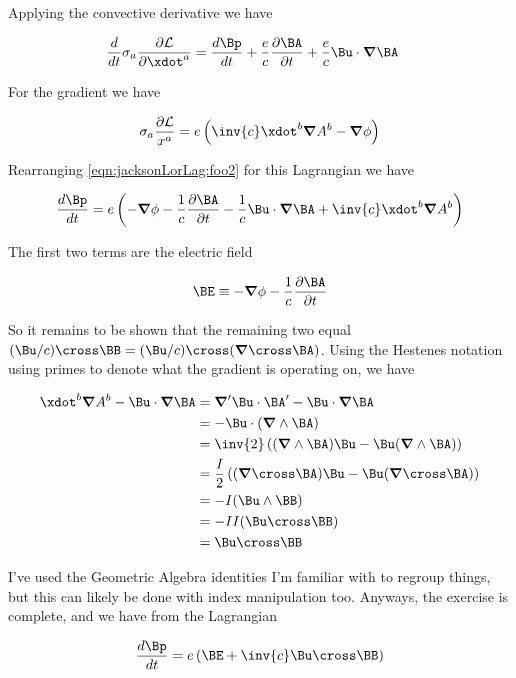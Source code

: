 Applying the convective derivative we have

\begin{align*}
\frac{d}{dt} 
\sigma_a \frac{\partial \LL}{\partial \xdot^a}
&=
\frac{d\Bp}{dt} 
+ \frac{e}{c} \frac{\partial \BA}{\partial t}
+ \frac{e}{c} \Bu \cdot \spacegrad \BA
\end{align*}

For the gradient we have

\begin{align*}
\sigma_a \frac{\partial \LL}{x^a} = e\left( \inv{c}\xdot^b \spacegrad A^b - \spacegrad \phi \right)
\end{align*}

Rearranging \ref{eqn:jacksonLorLag:foo2} for this Lagrangian we have

\begin{align*}
\frac{d\Bp}{dt} 
=
e \left( 
- \spacegrad \phi
- \frac{1}{c} \frac{\partial \BA}{\partial t}
- \frac{1}{c} \Bu \cdot \spacegrad \BA
 +\inv{c} \xdot^b \spacegrad A^b 
\right)
\end{align*}

The first two terms are the electric field

\begin{align*}
\BE \equiv
- \spacegrad \phi
- \frac{1}{c} \frac{\partial \BA}{\partial t}
\end{align*}

So it remains to be shown that the remaining two equal $(\Bu/c) \cross \BB = (\Bu/c) \cross (\spacegrad \cross \BA)$.  Using the Hestenes notation using primes to denote what the gradient is operating on, we have

\begin{align*}
\xdot^b \spacegrad A^b - \Bu \cdot \spacegrad \BA
&=
\spacegrad' \Bu \cdot \BA' - \Bu \cdot \spacegrad \BA \\
&=
-\Bu \cdot (\spacegrad \wedge \BA) \\
&=
\inv{2} \left(
(\spacegrad \wedge \BA) \Bu  -
\Bu (\spacegrad \wedge \BA) 
\right) \\
&=
\frac{I}{2} \left(
(\spacegrad \cross \BA) \Bu -
\Bu (\spacegrad \cross \BA) 
\right) \\
&=
-I (\Bu \wedge \BB) \\
&=
-I I (\Bu \cross \BB) \\
&=
\Bu \cross \BB \\
\end{align*}

I've used the Geometric Algebra identities I'm familiar with to regroup things, but this can likely be done with index manipulation too.  Anyways, the exercise is complete, and we have from the Lagrangian

\begin{align}\label{eqn:jacksonLorLag:foo3}
\frac{d\Bp}{dt} = e \left( \BE + \inv{c} \Bu \cross \BB \right)
\end{align}

\EndArticle
